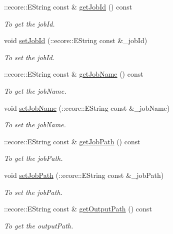 \begin{DoxyCompactItemize}
::ecore::EString const \& \hyperlink{classTMS__Data_1_1Job_a6541ec2c7eea2fe6f3afb3d8c1571934}{getJobId} () const 
\begin{DoxyCompactList}\small\item\em To get the jobId. \item\end{DoxyCompactList}\item 
void \hyperlink{classTMS__Data_1_1Job_a633024ede531fbe2766154a69332779c}{setJobId} (::ecore::EString const \&\_\-jobId)
\begin{DoxyCompactList}\small\item\em To set the jobId. \item\end{DoxyCompactList}\item 
::ecore::EString const \& \hyperlink{classTMS__Data_1_1Job_ac49d0ae5bb888f14b2b31619b2c14c15}{getJobName} () const 
\begin{DoxyCompactList}\small\item\em To get the jobName. \item\end{DoxyCompactList}\item 
void \hyperlink{classTMS__Data_1_1Job_a0d36cc2931403265ac9e440afa8b0dcc}{setJobName} (::ecore::EString const \&\_\-jobName)
\begin{DoxyCompactList}\small\item\em To set the jobName. \item\end{DoxyCompactList}\item 
::ecore::EString const \& \hyperlink{classTMS__Data_1_1Job_a506a7cecccf08f808c96c267daeec840}{getJobPath} () const 
\begin{DoxyCompactList}\small\item\em To get the jobPath. \item\end{DoxyCompactList}\item 
void \hyperlink{classTMS__Data_1_1Job_aaa12ff710bd82e1674b57439ad538148}{setJobPath} (::ecore::EString const \&\_\-jobPath)
\begin{DoxyCompactList}\small\item\em To set the jobPath. \item\end{DoxyCompactList}\item 
::ecore::EString const \& \hyperlink{classTMS__Data_1_1Job_a4f5822e0f1a77c6df39c0882cab49c8b}{getOutputPath} () const 
\begin{DoxyCompactList}\small\item\em To get the outputPath. \item\end{DoxyCompactList}\item 

\end{DoxyCompactItemize}
